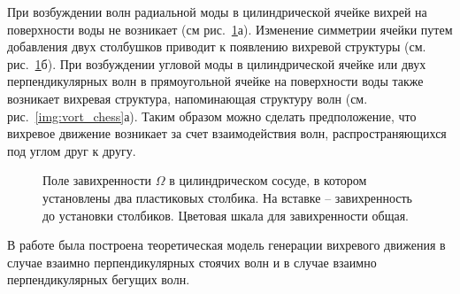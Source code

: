 При возбуждении волн радиальной моды в цилиндрической ячейке вихрей на поверхности воды не возникает (см рис.~\ref{img:vort_st}а). Изменение симметрии ячейки путем добавления двух столбушков приводит к появлению вихревой структуры  (см. рис.~\ref{img:vort_st}б). При возбуждении угловой моды в цилиндрической ячейке или двух перпендикулярных волн в прямоугольной ячейке на поверхности воды также возникает вихревая структура, напоминающая структуру волн (см. рис.~\ref{img:vort_chess}а). Таким образом можно сделать предположение, что вихревое движение возникает за счет взаимодействия волн, распространяющихся под углом друг к другу.

\begin{figure}[ht]
 \begin{minipage}[ht]{0.49\linewidth}
 \end{minipage}
 \hfill
 \begin{minipage}[ht]{0.49\linewidth}
 \end{minipage}
 \caption{Поле завихренности $\Omega$ в цилиндрическом сосуде, в котором установлены два пластиковых столбика. На вставке – завихренность до установки столбиков. Цветовая шкала для завихренности общая.}
 \label{img:vort_st} 
\end{figure}

В работе \cite{F6} была построена теоретическая модель генерации вихревого движения в случае взаимно перпендикулярных стоячих волн и в случае взаимно перпендикулярных бегущих волн.

